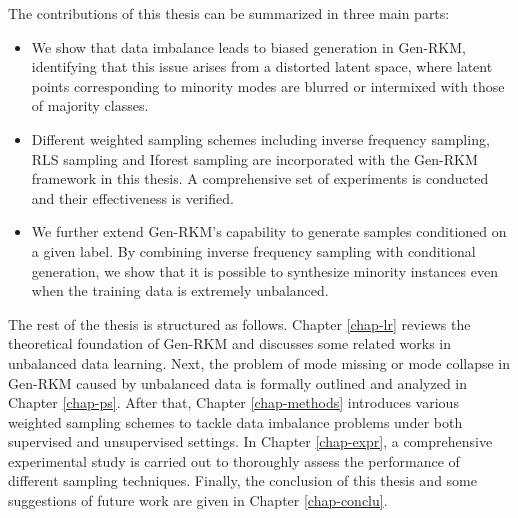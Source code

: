 \begin{description}[leftmargin=0pt]
    \item[Contribution] The contributions of this thesis can be summarized in three main parts:
    \begin{itemize}[label={--}]
        \item We show that data imbalance leads to biased generation in Gen-RKM, identifying that this issue arises from a distorted latent space, where latent points corresponding to minority modes are blurred or intermixed with those of majority classes.
        \item Different weighted sampling schemes including inverse frequency sampling, RLS sampling and Iforest sampling are incorporated with the Gen-RKM framework in this thesis. A comprehensive set of experiments is conducted and their effectiveness is verified.
        \item We further extend Gen-RKM's capability to generate samples conditioned on a given label. By combining inverse frequency sampling with conditional generation, we show that it is possible to synthesize minority instances even when the training data is extremely unbalanced.  
    \end{itemize}

    \item[Thesis Organization] The rest of the thesis is structured as follows. Chapter \ref{chap-lr} reviews the theoretical foundation of Gen-RKM and discusses some related works in unbalanced data learning. Next, the problem of mode missing or mode collapse in Gen-RKM caused by unbalanced data is formally outlined and analyzed in Chapter \ref{chap-ps}. After that, Chapter \ref{chap-methods} introduces various weighted sampling schemes to tackle data imbalance problems under both supervised and unsupervised settings. In Chapter \ref{chap-expr}, a comprehensive experimental study is carried out to thoroughly assess the performance of different sampling techniques. Finally, the conclusion of this thesis and some suggestions of future work are given in Chapter \ref{chap-conclu}.
\end{description}